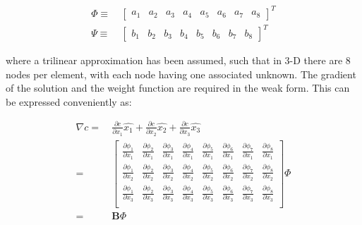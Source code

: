 \documentclass[10pt]{article}
\begin{document}
\begin{equation}
\begin{aligned}
\Phi\equiv&\ \begin{bmatrix}a_1 & a_2 & a_3 & a_4 & a_5 & a_6 & a_7 & a_8\end{bmatrix}^T\\
\Psi\equiv&\ \begin{bmatrix}b_1 & b_2 & b_3 & b_4 & b_5 & b_6 & b_7 & b_8\end{bmatrix}^T\
\end{aligned}
\end{equation}

where a trilinear approximation has been assumed, such that in 3-D there are 8 nodes per element, with each node having one associated unknown. The gradient of the solution and the weight function are required in the weak form. This can be expressed conveniently as:

\begin{equation}
\begin{aligned}
\nabla c=&\ \frac{\partial c}{\partial x_1}\hat{x_1}+\frac{\partial c}{\partial x_2}\hat{x_2}+\frac{\partial c}{\partial x_3}\hat{x_3}\\
=&\ \begin{bmatrix}\frac{\partial \phi_1}{\partial x_1} & \frac{\partial \phi_2}{\partial x_1} & \frac{\partial \phi_3}{\partial x_1} & \frac{\partial \phi_4}{\partial x_1} & \frac{\partial \phi_5}{\partial x_1} & \frac{\partial \phi_6}{\partial x_1} & \frac{\partial \phi_7}{\partial x_1} & \frac{\partial \phi_8}{\partial x_1}\\
\frac{\partial \phi_1}{\partial x_2} & \frac{\partial \phi_2}{\partial x_2} & \frac{\partial \phi_3}{\partial x_2} & \frac{\partial \phi_4}{\partial x_2} & \frac{\partial \phi_5}{\partial x_2} & \frac{\partial \phi_6}{\partial x_2} & \frac{\partial \phi_7}{\partial x_2} & \frac{\partial \phi_8}{\partial x_2}\\
\frac{\partial \phi_1}{\partial x_3} & \frac{\partial \phi_2}{\partial x_3} & \frac{\partial \phi_3}{\partial x_3} & \frac{\partial \phi_4}{\partial x_3} & \frac{\partial \phi_5}{\partial x_3} & \frac{\partial \phi_6}{\partial x_3} & \frac{\partial \phi_7}{\partial x_3} & \frac{\partial \phi_8}{\partial x_3}\\ \end{bmatrix}
\Phi\\
=&\ \textbf{B}\Phi\\
\end{aligned}
\end{equation}
\end{document}
